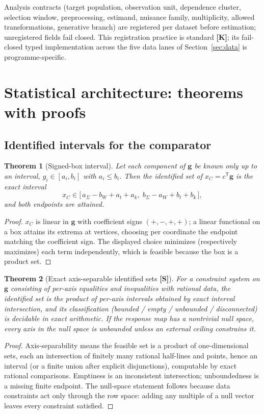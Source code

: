 \documentclass[10pt]{article}
\newtheorem{theorem}{Theorem}[section]
\theoremstyle{definition}
\newcommand{\tier}[1]{\textbf{[#1]}}
\begin{document}
Analysis contracts (target population, observation unit, dependence
cluster, selection window, preprocessing, estimand, nuisance family,
multiplicity, allowed transformations, generative branch) are
registered per dataset before estimation; unregistered fields fail
closed. This registration practice is standard \tier{K}; its
fail-closed typed implementation across the five data lanes of
Section~\ref{sec:data} is programme-specific.

\section{Statistical architecture: theorems with proofs}
\label{sec:stats}

\subsection{Identified intervals for the comparator}

\begin{theorem}[Signed-box interval]
\label{thm:t1p}
Let each component of $\bm g$ be known only up to an interval,
$g_i \in [a_i, b_i]$ with $a_i \le b_i$. Then the identified set of
$x_C = c^{\mathsf T}\bm g$ is the exact interval
\begin{equation}
x_C \in \Big[\,a_\Sigma - b_W + a_t + a_k,\;
             b_\Sigma - a_W + b_t + b_k\,\Big],
\end{equation}
and both endpoints are attained.
\end{theorem}
\begin{proof}
$x_C$ is linear in $\bm g$ with coefficient signs $(+,-,+,+)$; a linear
functional on a box attains its extrema at vertices, choosing per
coordinate the endpoint matching the coefficient sign. The displayed
choice minimizes (respectively maximizes) each term independently,
which is feasible because the box is a product set.
\end{proof}

\begin{theorem}[Exact axis-separable identified sets \tier{S}]
\label{thm:idset}
For a constraint system on $\bm g$ consisting of per-axis equalities
and inequalities with rational data, the identified set is the product
of per-axis intervals obtained by exact interval intersection, and its
classification (bounded / empty / unbounded / disconnected) is
decidable in exact arithmetic. If the response map has a nontrivial
null space, every axis in the null space is unbounded unless an
external ceiling constrains it.
\end{theorem}
\begin{proof}
Axis-separability means the feasible set is a product of
one-dimensional sets, each an intersection of finitely many rational
half-lines and points, hence an interval (or a finite union after
explicit disjunctions), computable by exact rational comparisons.
Emptiness is an inconsistent intersection; unboundedness is a missing
finite endpoint. The null-space statement follows because data
constraints act only through the row space: adding any multiple of a
null vector leaves every constraint satisfied.
\end{proof}
\end{document}

